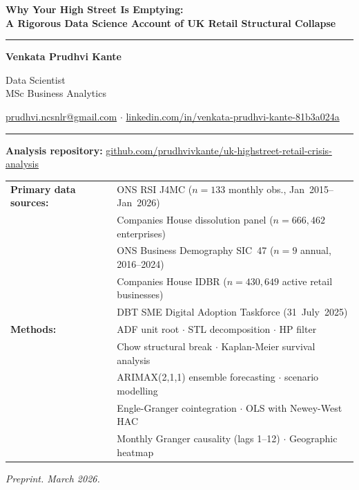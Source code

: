 \documentclass[12pt,a4paper]{article}
\begin{document}
\sloppy

\begin{titlepage}
\begin{center}
\vspace*{1.5cm}
{\LARGE\bfseries\color{NavyBlue}
Why Your High Street Is Emptying:\\[0.4em]
\large A Rigorous Data Science Account of UK Retail Structural Collapse%
}
\vspace{1.2cm}
\rule{0.75\linewidth}{1.2pt}
\vspace{0.8cm}

{\large\bfseries Venkata Prudhvi Kante}

\vspace{0.4cm}
{\normalsize Data Scientist\\[0.3em]MSc Business Analytics}

\vspace{0.5cm}
{\small\color{MidBlue}
\href{mailto:prudhvi.ncsnlr@gmail.com}{prudhvi.ncsnlr@gmail.com}
\quad$\cdot$\quad
\href{https://linkedin.com/in/venkata-prudhvi-kante-81b3a024a}
     {linkedin.com/in/venkata-prudhvi-kante-81b3a024a}
}

\vspace{0.9cm}
\rule{0.75\linewidth}{0.6pt}
\vspace{0.6cm}

{\small
\textbf{Analysis repository:}
\href{https://github.com/prudhvivkante/uk-highstreet-retail-crisis-analysis}
     {github.com/prudhvivkante/uk-highstreet-retail-crisis-analysis}
}

\vspace{0.5cm}
{\small\itshape
\begin{tabular}{@{}ll@{}}
\textbf{Primary data sources:}
  & ONS RSI J4MC ($n=133$ monthly obs., Jan~2015--Jan~2026) \\
  & Companies House dissolution panel ($n=666{,}462$ enterprises) \\
  & ONS Business Demography SIC~47 ($n=9$ annual, 2016--2024) \\
  & Companies House IDBR ($n=430{,}649$ active retail businesses) \\
  & DBT SME Digital Adoption Taskforce (31~July~2025) \\[4pt]
\textbf{Methods:}
  & ADF unit root $\cdot$ STL decomposition $\cdot$ HP filter \\
  & Chow structural break $\cdot$ Kaplan-Meier survival analysis \\
  & ARIMAX(2,1,1) ensemble forecasting $\cdot$ scenario modelling \\
  & Engle-Granger cointegration $\cdot$ OLS with Newey-West HAC \\
  & Monthly Granger causality (lags 1--12) $\cdot$ Geographic heatmap \\
\end{tabular}
}

\vspace{0.6cm}
{\small\color{gray}\textit{Preprint. March 2026.}}
\end{center}
\end{titlepage}
\end{document}
